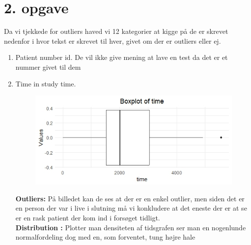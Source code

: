 \chapter{2. opgave}
Da vi tjekkede for outliers haved vi 12 kategorier at kigge på de er skrevet nedenfor i hvor tekst er skrevet til hver, givet om der er outliers eller ej.
\begin{enumerate}
\item Patient number id. \newline
De vil ikke give mening at lave en test da det er et nummer givet til dem 
\item  Time in study time.\\
\begin{figure}[h]
    \centering
    \includegraphics[width=1\linewidth]{Project/BIlleder_Duration/Time_Outliers.jpeg}
\end{figure}
\textbf{Outliers: }På billedet kan de ses at der er en enkel outlier, men siden det er en person der var i live i slutning må vi konkludere at det eneste der er at se er en rask patient der kom ind i forsøget tidligt.\\
\textbf{Distribution :} Plotter man densiteten af tidsgrafen ser man en nogenlunde normalfordeling dog med en, som forventet, tung højre hale



\end{enumerate}
